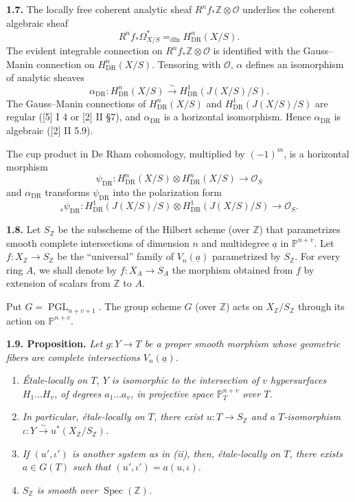 \documentclass[10pt]{article}
\newcommand{\Pj}{\mathbb P}
\newcommand{\Z}{\mathbb Z}
\newcommand{\DR}{\mathrm{DR}}
\newcommand{\Spec}{\operatorname{Spec}}
\newcommand{\PGL}{\operatorname{PGL}}
\newcommand{\iso}{\xrightarrow{\sim}}
\newcommand{\dfneq}{\mathrel{=_{\mathrm{dfn}}}}
\newcommand{\sourcebreak}{\clearpage}
\begin{document}
\noindent\textbf{1.7.} The locally free coherent analytic sheaf \(R^nf_*\Z\otimes\mathcal O\) underlies the coherent algebraic sheaf
\[
R^nf_*\Omega^*_{X/S}\dfneq H^n_{\DR}(X/S).
\]
The evident integrable connection on \(R^nf_*\Z\otimes\mathcal O\) is identified with the Gauss--Manin connection on \(H^n_{\DR}(X/S)\). Tensoring with \(\mathcal O\), \(\alpha\) defines an isomorphism of analytic sheaves
\[
\tag{1.7.1}
\alpha_{\DR}:H^n_{\DR}(X/S)\iso H^1_{\DR}(J(X/S)/S).
\]
The Gauss--Manin connections of \(H^n_{\DR}(X/S)\) and \(H^1_{\DR}(J(X/S)/S)\) are regular ([5] I 4 or [2] II \S 7), and \(\alpha_{\DR}\) is a horizontal isomorphism. Hence \(\alpha_{\DR}\) is algebraic ([2] II 5.9).

The cup product in De Rham cohomology, multiplied by \((-1)^m\), is a horizontal morphism
\[
\tag{1.7.2}
\psi_{\DR}:H^n_{\DR}(X/S)\otimes H^n_{\DR}(X/S)\longrightarrow\mathcal O_S
\]
and \(\alpha_{\DR}\) transforms \(\psi_{\DR}\) into the polarization form
\[
\tag{1.7.3}
{}_s\psi_{\DR}:H^1_{\DR}(J(X/S)/S)\otimes H^1_{\DR}(J(X/S)/S)\longrightarrow\mathcal O_S.
\]

\sourcebreak
\noindent\textbf{1.8.} Let \(S_\Z\) be the subscheme of the Hilbert scheme (over \(\Z\)) that parametrizes smooth complete intersections of dimension \(n\) and multidegree \(\underline a\) in \(\Pj^{n+v}\). Let \(f:X_\Z\to S_\Z\) be the ``universal'' family of \(V_n(\underline a)\) parametrized by \(S_\Z\). For every ring \(A\), we shall denote by \(f:X_A\to S_A\) the morphism obtained from \(f\) by extension of scalars from \(\Z\) to \(A\).

Put \(G=\PGL_{n+v+1}\). The group scheme \(G\) (over \(\Z\)) acts on \(X_\Z/S_\Z\) through its action on \(\Pj^{n+v}\).

\noindent\textbf{1.9. Proposition.} \emph{Let \(g:Y\to T\) be a proper smooth morphism whose geometric fibers are complete intersections \(V_n(\underline a)\).}
\begin{enumerate}[label=(\roman*)]
\item \emph{Étale-locally on \(T\), \(Y\) is isomorphic to the intersection of \(v\) hypersurfaces \(H_1\ldots H_v\), of degrees \(a_1\ldots a_v\), in projective space \(\Pj_T^{n+v}\) over \(T\).}
\item \emph{In particular, étale-locally on \(T\), there exist \(u:T\to S_\Z\) and a \(T\)-isomorphism \(\iota:Y\iso u^*(X_\Z/S_\Z)\).}
\item \emph{If \((u',\iota')\) is another system as in (ii), then, étale-locally on \(T\), there exists \(a\in G(T)\) such that \((u',\iota')=a(u,\iota)\).}
\item \emph{\(S_\Z\) is smooth over \(\Spec(\Z)\).}
\end{enumerate}
\end{document}

